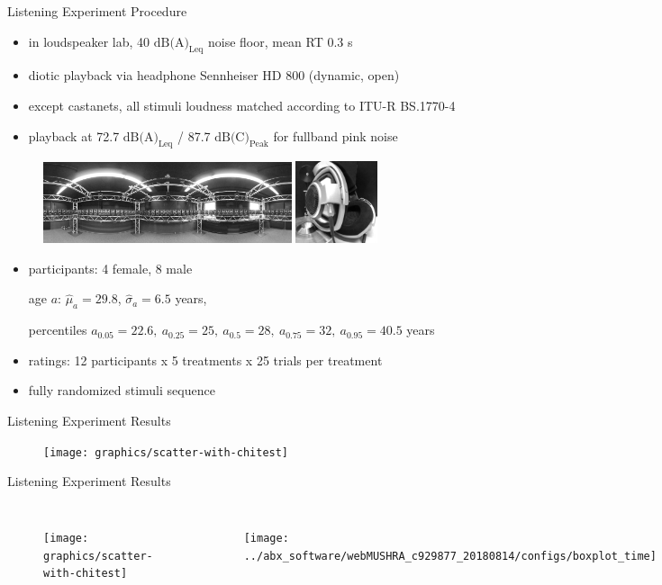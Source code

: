 \documentclass[mathserif]{intbeamer}
\begin{document}
\begin{frame}{Listening Experiment Procedure}
\begin{itemize}
\item in loudspeaker lab, 40 $\text{dB(A)}_\text{Leq}$ noise floor, mean RT 0.3 s
\item diotic playback via \textcolor{colnonzero}{headphone} Sennheiser HD 800 (dynamic, open)
\item except castanets, all stimuli loudness matched according to ITU-R BS.1770-4
\item playback at 72.7 $\text{dB(A)}_\text{Leq}$ / 87.7 $\text{dB(C)}_\text{Peak}$
for fullband pink noise
\end{itemize}
\begin{figure}
\includegraphics[width=0.65\textwidth]{graphics/URO_array_panorama_2}
\includegraphics[width=0.215\textwidth]{graphics/HD800_2}
\end{figure}
\begin{itemize}
\item participants: 4 female, 8 male
\begin{tiny}
age $a$: $\hat{\mu}_a=29.8$, $\hat{\sigma}_a=6.5$ years,

percentiles $a_{0.05}=22.6,~a_{0.25}=25,~a_{0.5}=28,~a_{0.75}=32,~a_{0.95}=40.5$ years
\end{tiny}
\item ratings: 12 participants x 5 treatments x 25 trials per treatment
\item fully randomized stimuli sequence
\end{itemize}
\end{frame}
%
%
%
\begin{frame}{Listening Experiment Results}
\begin{figure}
\texttt{[image: graphics/scatter-with-chitest]}
\end{figure}
\end{frame}
%
%
%
\begin{frame}{Listening Experiment Results}
\begin{columns}[T]
\begin{figure}
\texttt{[image: graphics/scatter-with-chitest]}
\end{figure}
\begin{figure}
\texttt{[image: ../abx\_software/webMUSHRA\_c929877\_20180814/configs/boxplot\_time]}
\end{figure}
\end{columns}
\end{frame}
%
%
%
\end{document}

